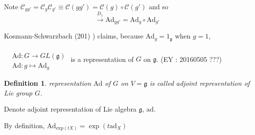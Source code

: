 \documentclass[10pt]{amsart}
\newtheorem{definition}{Definition}
\begin{document}
\begin{multicols*}{2}
Note $\mathcal{C}_{gg'} = \mathcal{C}_g \mathcal{C}_{g'} \equiv \mathcal{C}(gg') = \mathcal{C}(g)\circ \mathcal{C}(g')$ and so 
\[
\xrightarrow{ D_1} \text{Ad}_{gg'} = \text{Ad}_g \circ \text{Ad}_{g'}
\]

Kosmann-Schwarzbach (201) \cite{YKosmann-Schwarzbach2010}) claims, because $\text{Ad}_g = 1_{\mathfrak{g}}$ when $g=1$, 

$\begin{aligned} & \quad \\
& \text{Ad}:G \to GL(\mathfrak{g}) \\
& \text{Ad}:g\mapsto \text{Ad}_g\end{aligned}$ is a representation of $G$ on $\mathfrak{g}$.   (EY : 20160505 ???)

\begin{definition}
	representation $\text{Ad}$ of $G$ on $V=\mathfrak{g}$ is called adjoint representation of Lie group $G$.  
\end{definition}

Denote adjoint representation of Lie algebra $\mathfrak{g}$, $\text{ad}$.  

By definition, $\text{Ad}_{\text{exp}(tX)} = \exp{ (t\text{ad}_X)}$


\end{multicols*}
\end{document}
